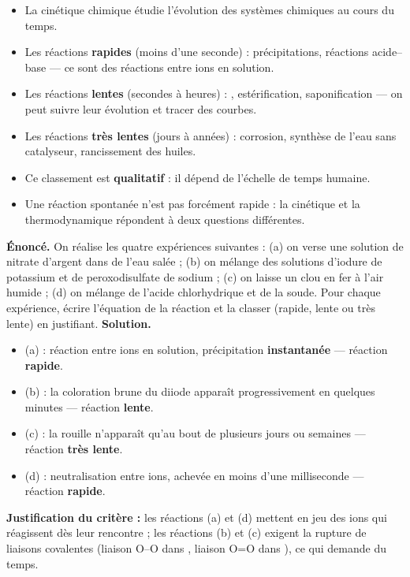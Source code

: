 \documentclass[11pt]{article}
\newcommand{\cle}[1]{{\popxbold\color{popdark}#1}}
\begin{document}
\begin{aretenir}
\begin{itemize}
  \item La \cle{cinétique chimique} étudie l'évolution des systèmes chimiques au cours du temps.
  \item Les réactions \textbf{rapides} (moins d'une seconde) : précipitations, réactions acide--base — ce sont des réactions entre ions en solution.
  \item Les réactions \textbf{lentes} (secondes à heures) : , estérification, saponification — on peut suivre leur évolution et tracer des courbes.
  \item Les réactions \textbf{très lentes} (jours à années) : corrosion, synthèse de l'eau sans catalyseur, rancissement des huiles.
  \item Ce classement est \textbf{qualitatif} : il dépend de l'échelle de temps humaine.
  \item Une réaction spontanée n'est pas forcément rapide : la cinétique et la thermodynamique répondent à deux questions différentes.
\end{itemize}
\end{aretenir}

\begin{exoresolu}
\textbf{Énoncé.} On réalise les quatre expériences suivantes : (a) on verse une solution de nitrate d'argent dans de l'eau salée ; (b) on mélange des solutions d'iodure de potassium et de peroxodisulfate de sodium ; (c) on laisse un clou en fer à l'air humide ; (d) on mélange de l'acide chlorhydrique et de la soude. Pour chaque expérience, écrire l'équation de la réaction et la classer (rapide, lente ou très lente) en justifiant.
\tcblower
\textbf{Solution.}
\begin{itemize}
  \item (a)  : réaction entre ions en solution, précipitation \textbf{instantanée} — réaction \textbf{rapide}.
  \item (b)  : la coloration brune du diiode apparaît progressivement en quelques minutes — réaction \textbf{lente}.
  \item (c)  : la rouille n'apparaît qu'au bout de plusieurs jours ou semaines — réaction \textbf{très lente}.
  \item (d)  : neutralisation entre ions, achevée en moins d'une milliseconde — réaction \textbf{rapide}.
\end{itemize}
\textbf{Justification du critère :} les réactions (a) et (d) mettent en jeu des ions qui réagissent dès leur rencontre ; les réactions (b) et (c) exigent la rupture de liaisons covalentes (liaison O--O dans , liaison O=O dans ), ce qui demande du temps.
\end{exoresolu}
\end{document}
